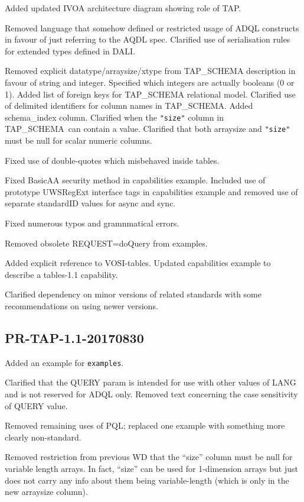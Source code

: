 \documentclass[11pt,letter]{ivoa}
\newcommand{\tapschema}{TAP\_SCHE\-MA}
\newcommand{\tapschema}{\mbox{%
  \relsize{-0.5}TAP\discretionary{-}{}{\kern-2pt\_}SCHEMA}}
\begin{document}
Added updated IVOA architecture diagram showing role of TAP.

Removed language that somehow defined or restricted usage of ADQL constructs in
favour of just referring to the AQDL spec. Clarified use of serialisation
rules for extended types defined in DALI.

Removed explicit datatype/arraysize/xtype from \tapschema{} description
in favour of string and integer. Specified which integers are actually
booleans (0 or 1). Added list of foreign keys for \tapschema{}
relational model. Clarified use of delimited identifiers for column names in 
\tapschema. Added schema\_index column. Clarified when the \verb|"size"| column 
in \tapschema\ can contain a value. Clarified that both arraysize and \verb|"size"|
must be null for scalar numeric columns.

Fixed use of double-quotes which misbehaved inside tables. 

Fixed BasicAA security method in capabilities example. Included use of prototype
UWSRegExt interface tags in capabilities example and removed use of separate
standardID values for async and sync.

Fixed numerous typos and gramnmatical errors.

Removed obsolete REQUEST=doQuery from examples.

Added explicit reference to VOSI-tables. Updated capabilities example to describe a
tables-1.1 capability.

Clarified dependency on minor versions of related standards with some recommendations on
using newer versions.

\subsection{PR-TAP-1.1-20170830}

Added an example for \verb|examples|.

Clarified that the QUERY param is intended for use with other values of LANG and is not
reserved for ADQL only. Removed text concerning the case sensitivity of QUERY value.

Removed remaining uses of PQL; replaced one example with something more clearly non-standard.

Removed restriction from previous WD that the ``size'' column must be null for variable length arrays. In fact, ``size'' can be used for 1-dimension arrays but just does not carry any info about them being variable-length (which is only in the new arraysize column).
\end{document}

